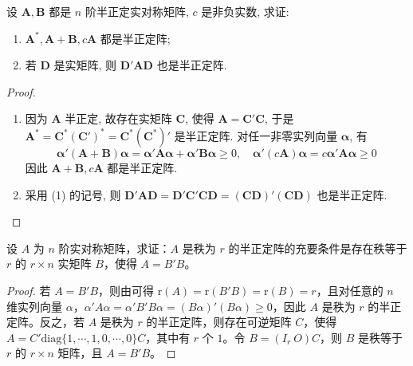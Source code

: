 \documentclass[../../main.tex]{subfiles}%
\begin{document}
\begin{proposition}\label{proposition:半正定阵的相关性质}
设 \(\boldsymbol{A},\boldsymbol{B}\) 都是 \(n\) 阶半正定实对称矩阵, \(c\) 是非负实数, 求证:
\begin{enumerate}[(1)]
\item \(\boldsymbol{A}^*,\boldsymbol{A}+\boldsymbol{B},c\boldsymbol{A}\) 都是半正定阵;
\item 若 \(\boldsymbol{D}\) 是实矩阵, 则 \(\boldsymbol{D}'\boldsymbol{A}\boldsymbol{D}\) 也是半正定阵.
\end{enumerate}
\end{proposition}
\begin{proof}
\begin{enumerate}[(1)]
\item 因为 \(\boldsymbol{A}\) 半正定, 故存在实矩阵 \(\boldsymbol{C}\), 使得 \(\boldsymbol{A}=\boldsymbol{C}'\boldsymbol{C}\), 于是 \(\boldsymbol{A}^*=\boldsymbol{C}^*(\boldsymbol{C}')^*=\boldsymbol{C}^*(\boldsymbol{C}^*)'\) 是半正定阵. 对任一非零实列向量 \(\boldsymbol{\alpha}\), 有
\[\boldsymbol{\alpha}'(\boldsymbol{A}+\boldsymbol{B})\boldsymbol{\alpha}=\boldsymbol{\alpha}'\boldsymbol{A}\boldsymbol{\alpha}+\boldsymbol{\alpha}'\boldsymbol{B}\boldsymbol{\alpha}\geqslant 0,\quad\boldsymbol{\alpha}'(c\boldsymbol{A})\boldsymbol{\alpha}=c\boldsymbol{\alpha}'\boldsymbol{A}\boldsymbol{\alpha}\geqslant 0\]
因此 \(\boldsymbol{A}+\boldsymbol{B},c\boldsymbol{A}\) 都是半正定阵.
\item 采用 (1) 的记号, 则 \(\boldsymbol{D}'\boldsymbol{A}\boldsymbol{D}=\boldsymbol{D}'\boldsymbol{C}'\boldsymbol{C}\boldsymbol{D}=(\boldsymbol{C}\boldsymbol{D})'(\boldsymbol{C}\boldsymbol{D})\) 也是半正定阵.
\end{enumerate} 
\end{proof}

\begin{proposition}\label{proposition:半正定阵的行满秩分解}
设 $A$ 为 $n$ 阶实对称矩阵，求证：$A$ 是秩为 $r$ 的半正定阵的充要条件是存在秩等于 $r$ 的 $r\times n$ 实矩阵 $B$，使得 $A = B'B$。 
\end{proposition}
\begin{proof}
若 $A = B'B$，则由可得 $\mathrm{r}(A)=\mathrm{r}(B'B)=\mathrm{r}(B)=r$，且对任意的 $n$ 维实列向量 $\alpha$，$\alpha'A\alpha=\alpha'B'B\alpha=(B\alpha)'(B\alpha)\geqslant 0$，因此 $A$ 是秩为 $r$ 的半正定阵。反之，若 $A$ 是秩为 $r$ 的半正定阵，则存在可逆矩阵 $C$，使得 $A = C'\mathrm{diag}\{1,\cdots,1,0,\cdots,0\}C$，其中有 $r$ 个 $1$。令 $B=(I_r\ O)C$，则 $B$ 是秩等于 $r$ 的 $r\times n$ 矩阵，且 $A = B'B$。 
\end{proof}
\end{document}

